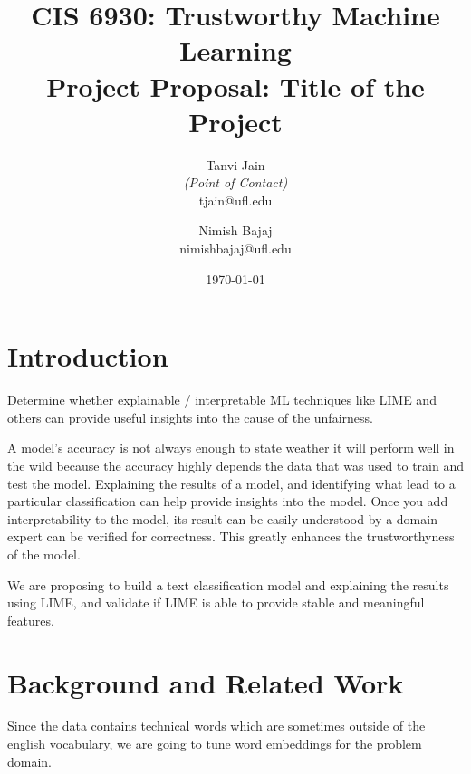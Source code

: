 \documentclass[11pt,letterpaper]{article}
\title{CIS 6930: Trustworthy Machine Learning\\
	\Large Project Proposal: Title of the Project} %
\author{
        Tanvi Jain \\{\em (Point of Contact)} \\
        tjain@ufl.edu\\
        \and
        Nimish Bajaj \\
        nimishbajaj@ufl.edu\\
}
\date{\today}
\begin{document}

\maketitle




\section{Introduction}


Determine whether explainable / interpretable ML techniques like LIME and others can provide useful insights into the cause of the unfairness.

A model's accuracy is not always enough to state weather it will perform well in the wild because the accuracy highly depends the data that was used to train and test the model. 
Explaining the results of a model, and identifying what lead to a particular classification can help provide insights into the model.
Once you add interpretability to the model, its result can be easily understood by a domain expert can be verified for correctness. This greatly enhances the trustworthyness of the model.


We are proposing to build a text classification model and explaining the results using LIME, and validate if LIME is able to provide stable and meaningful features. 

\section{Background and Related Work}





Since the data contains technical words which are sometimes outside of the english vocabulary, we are going to tune word embeddings for the problem domain.
\end{document}
